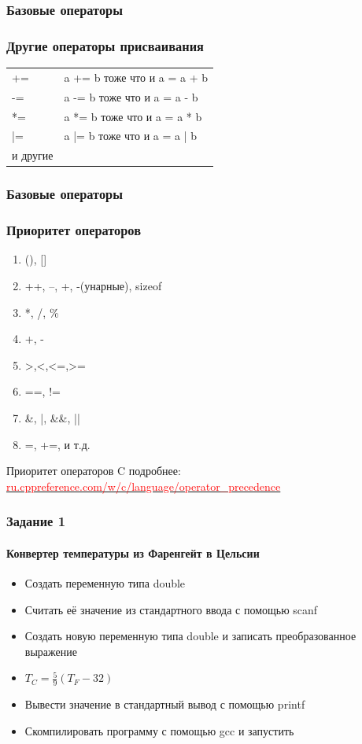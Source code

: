 \documentclass[12pt,pdf,hyperref={unicode}]{beamer}
\begin{document}
\begin{frame}
\frametitle{Базовые операторы}
\frametitle{Другие операторы присваивания}
\begin{center}
\begin{tabular}{ l l}
  += & a += b тоже что и a = a + b  \\
  -= & a -= b тоже что и a = a - b  \\
  *= & a *= b тоже что и a = a * b  \\
  |= & a |= b тоже что и a = a | b  \\
  и другие
\end{tabular}
\end{center}
\end{frame}

\begin{frame}
\frametitle{Базовые операторы}
\frametitle{Приоритет операторов}
\begin{center}
\begin{enumerate}
\item (), []
\item ++, --, +, -(унарные), sizeof
\item *, /, \%
\item +, -
\item >,<,<=,>=
\item ==, !=
\item \&, |, \&\&, ||
\item =, +=, и т.д.
\end{enumerate}
\end{center}
Приоритет операторов C подробнее:\\
\href{http://ru.cppreference.com/w/c/language/operator_precedence}
{\textcolor{red}{ru.cppreference.com/w/c/language/operator\_precedence}}
\end{frame}

\fi


\begin{frame}
\frametitle{Задание 1} 
\framesubtitle{Конвертер температуры из Фаренгейт в Цельсии} 
\begin{center}
\begin{itemize}
\item Создать переменную типа double \\
\item Считать её значение из стандартного ввода с помощью scanf\\
\item Создать новую переменную типа double и записать преобразованное выражение \\
\item $T_C = \frac{5}{9}(T_F-32)$\\
\item Вывести значение в стандартный вывод с помощью printf\\
\item Скомпилировать программу с помощью gcc и запустить
\end{itemize}
\end{center}
\end{frame}
\end{document}
